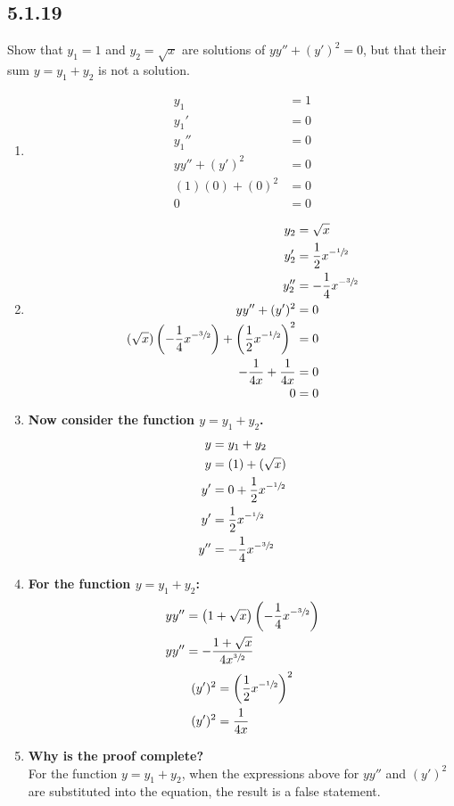 \documentclass{article}
\begin{document}
\subsection{5.1.19}
Show that $ y_1 = 1 $ and $ y_2 = \sqrt{x} $ are solutions of $ yy'' + (y')^2 = 0 $, but that their sum $ y = y_1 + y_2 $ is not a solution.
\begin{enumerate}[label=\textbf{(\alph*)}]
	\item
		\begin{align*}
			y_1 & = 1 \\
			y_1' & = 0 \\
			y_1'' & = 0 \\
			yy'' + (y')^2 & = 0 \\
			(1)(0) + (0)^2 & = 0 \\
			0 & = 0
		\end{align*}
	\item
		\begin{align*}
			y_2 & = \sqrt{x} \\
			y_2' & = \frac{1}{2}x^{-\sfrac{1}{2}} \\
			y_2'' & = -\frac{1}{4}x^{-\sfrac{3}{2}} \\
			yy'' + (y')^2 & = 0 \\
			(\sqrt{x}) \left( -\frac{1}{4}x^{-\sfrac{3}{2}} \right) + \left( \frac{1}{2}x^{-\sfrac{1}{2}} \right)^2 & = 0 \\
			-\frac{1}{4x} + \frac{1}{4x} & = 0 \\
			0 & = 0
		\end{align*}
	\item \textbf{Now consider the function $ y = y_1 + y_2 $.}
		\begin{align*}
			y & = y_1 + y_2 \\
			y & = (1) + (\sqrt{x}) \\
			y' & = 0 + \frac{1}{2}x^{-\sfrac{1}{2}} \\
			y' & = \frac{1}{2}x^{-\sfrac{1}{2}} \\
			y'' & = -\frac{1}{4}x^{-\sfrac{3}{2}}
		\end{align*}
	\item \textbf{For the function $ y = y_1 + y_2 $:}
		\begin{align*}
			yy'' & = \left( 1 + \sqrt{x} \right) \left( -\frac{1}{4}x^{-\sfrac{3}{2}} \right) \\
			yy'' & = -\frac{1 + \sqrt{x}}{4x^{\sfrac{3}{2}}}
		\end{align*}
		\begin{align*}
			(y')^2 & = \left( \frac{1}{2}x^{-\sfrac{1}{2}} \right)^2 \\
			(y')^2 & = \frac{1}{4x}
		\end{align*}
	\item \textbf{Why is the proof complete?} \\
		For the function $ y = y_1 + y_2 $, when the expressions above for $ yy'' $ and $ (y')^2 $ are substituted into the equation, the result is a false statement.
\end{enumerate}
\end{document}
